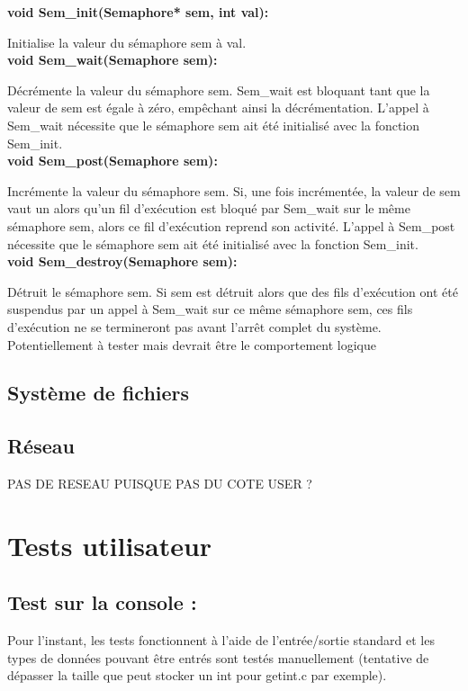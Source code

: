 \documentclass[12pt]{report}
\begin{document}
\textbf{void Sem\_init(Semaphore* sem, int val):}

Initialise la valeur du sémaphore sem à val.\\	


\textbf{void Sem\_wait(Semaphore sem):}

Décrémente la valeur du sémaphore sem. Sem\_wait est bloquant tant que la valeur de sem est égale à zéro, empêchant ainsi la décrémentation.
L'appel à Sem\_wait nécessite que le sémaphore sem ait été initialisé avec la fonction Sem\_init.\\


\textbf{void Sem\_post(Semaphore sem):}

Incrémente la valeur du sémaphore sem. Si, une fois incrémentée, la valeur de sem vaut un alors qu'un fil d'exécution est bloqué par Sem\_wait sur le même sémaphore sem, alors ce fil d'exécution reprend son activité.
L'appel à Sem\_post nécessite que le sémaphore sem ait été initialisé avec la fonction Sem\_init.\\


\textbf{void Sem\_destroy(Semaphore sem):}

Détruit le sémaphore sem. Si sem est détruit alors que des fils d'exécution ont été suspendus par un appel à Sem\_wait sur ce même sémaphore sem, ces fils d'exécution ne se termineront pas avant l'arrêt complet du système.\\
\color{red}Potentiellement à tester mais devrait être le comportement logique\color{black}

\section{Système de fichiers}


\section{Réseau}
\color{red}PAS DE RESEAU PUISQUE PAS DU COTE USER ?\color{black}


\chapter{Tests utilisateur}
\section{Test sur la console :}
Pour l’instant, les tests fonctionnent à l’aide de l’entrée/sortie standard et les types de données pouvant être entrés sont testés manuellement (tentative de dépasser la taille que peut stocker un int pour getint.c par exemple).
\end{document}
